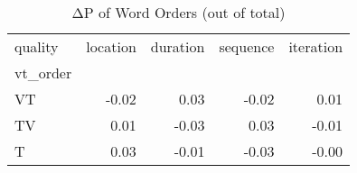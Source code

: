 \begin{table}[htbp!]
\centering
\caption{ΔP of Word Orders (out of total)}
\label{table:order_dp2}
\begin{tabular}{lrrrr}
\toprule
quality &  location &  duration &  sequence &  iteration \\
vt\_order &           &           &           &            \\
\midrule
VT       &     -0.02 &      0.03 &     -0.02 &       0.01 \\
TV       &      0.01 &     -0.03 &      0.03 &      -0.01 \\
T        &      0.03 &     -0.01 &     -0.03 &      -0.00 \\
\bottomrule
\end{tabular}
\end{table}
